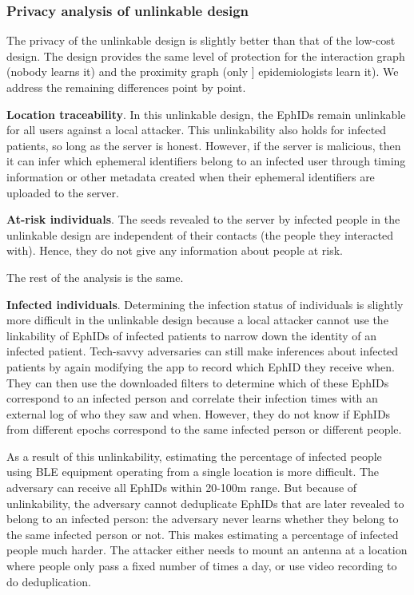 \documentclass[10.8pt,a4paper]{article}
\begin{document}
\subsubsection{Privacy analysis of unlinkable design}

The privacy of the unlinkable design is slightly better than that of the low-cost design. The design provides the same level of protection for the interaction graph (nobody learns it) and the proximity graph (only ] epidemiologists learn it). We address the remaining differences point by point.

\textbf{Location traceability}.  In this unlinkable design, the  EphIDs remain unlinkable for all users against a local attacker. This unlinkability also holds for infected patients, so long as the server is honest. However, if the server is malicious, then it can infer which ephemeral identifiers belong to an infected user through timing information or other metadata created when their ephemeral identifiers are uploaded to the server.

\textbf{At-risk individuals}.  The seeds revealed to the server by infected people in the unlinkable design  are independent of their contacts (the people they interacted with). Hence, they do not give any information about people at risk.

The rest of the analysis is the same.

\textbf{Infected individuals}.  Determining the infection status of individuals is slightly more difficult in the unlinkable design because a local attacker cannot use the linkability of  EphIDs of infected patients to narrow down the identity of an infected patient.
Tech-savvy adversaries can still make inferences about infected patients by again modifying the app to record which EphID they receive when. They can then use the downloaded filters to determine which of these EphIDs correspond to an infected person and correlate their infection times with an external log of who they saw and when. However, they do not know if EphIDs from different epochs correspond to the same infected person or different people.

As a result of this unlinkability, estimating the percentage of infected people using BLE equipment operating from a single location is more difficult. The adversary can receive all EphIDs within 20-100m range. But because of unlinkability, the adversary cannot deduplicate  EphIDs that are later revealed to belong to an infected person: the adversary never learns whether they belong to the  same infected person or not. This makes estimating a percentage of infected people much harder. The attacker either needs to mount an antenna at a location where people only pass a fixed number of times a day, or use video recording to do deduplication.
\end{document}
